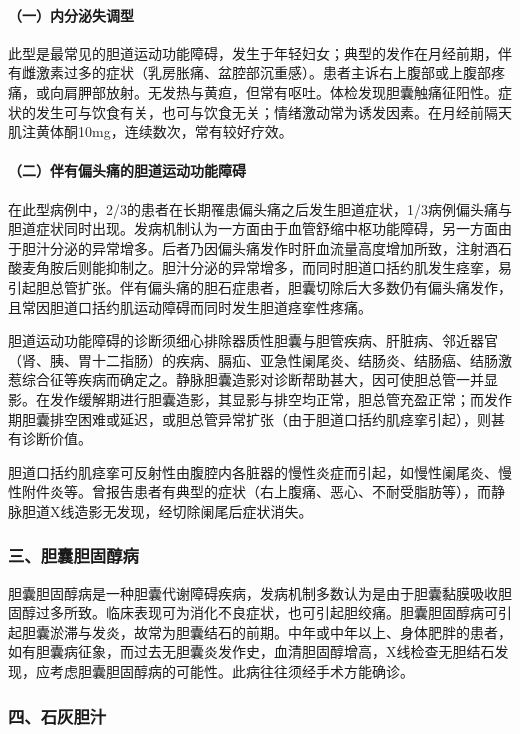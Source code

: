 \paragraph{（一）内分泌失调型}

此型是最常见的胆道运动功能障碍，发生于年轻妇女；典型的发作在月经前期，伴有雌激素过多的症状（乳房胀痛、盆腔部沉重感）。患者主诉右上腹部或上腹部疼痛，或向肩胛部放射。无发热与黄疸，但常有呕吐。体检发现胆囊触痛征阳性。症状的发生可与饮食有关，也可与饮食无关；情绪激动常为诱发因素。在月经前隔天肌注黄体酮10mg，连续数次，常有较好疗效。

\paragraph{（二）伴有偏头痛的胆道运动功能障碍}

在此型病例中，2/3的患者在长期罹患偏头痛之后发生胆道症状，1/3病例偏头痛与胆道症状同时出现。发病机制认为一方面由于血管舒缩中枢功能障碍，另一方面由于胆汁分泌的异常增多。后者乃因偏头痛发作时肝血流量高度增加所致，注射酒石酸麦角胺后则能抑制之。胆汁分泌的异常增多，而同时胆道口括约肌发生痉挛，易引起胆总管扩张。伴有偏头痛的胆石症患者，胆囊切除后大多数仍有偏头痛发作，且常因胆道口括约肌运动障碍而同时发生胆道痉挛性疼痛。

胆道运动功能障碍的诊断须细心排除器质性胆囊与胆管疾病、肝脏病、邻近器官（肾、胰、胃十二指肠）的疾病、膈疝、亚急性阑尾炎、结肠炎、结肠癌、结肠激惹综合征等疾病而确定之。静脉胆囊造影对诊断帮助甚大，因可使胆总管一并显影。在发作缓解期进行胆囊造影，其显影与排空均正常，胆总管充盈正常；而发作期胆囊排空困难或延迟，或胆总管异常扩张（由于胆道口括约肌痉挛引起），则甚有诊断价值。

胆道口括约肌痉挛可反射性由腹腔内各脏器的慢性炎症而引起，如慢性阑尾炎、慢性附件炎等。曾报告患者有典型的症状（右上腹痛、恶心、不耐受脂肪等），而静脉胆道X线造影无发现，经切除阑尾后症状消失。

\subsubsection{三、胆囊胆固醇病}

胆囊胆固醇病是一种胆囊代谢障碍疾病，发病机制多数认为是由于胆囊黏膜吸收胆固醇过多所致。临床表现可为消化不良症状，也可引起胆绞痛。胆囊胆固醇病可引起胆囊淤滞与发炎，故常为胆囊结石的前期。中年或中年以上、身体肥胖的患者，如有胆囊病征象，而过去无胆囊炎发作史，血清胆固醇增高，X线检查无胆结石发现，应考虑胆囊胆固醇病的可能性。此病往往须经手术方能确诊。

\subsubsection{四、石灰胆汁}

